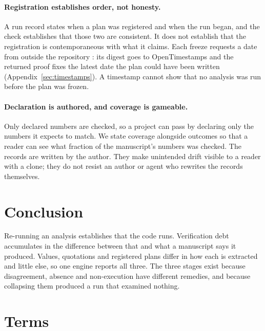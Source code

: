 \documentclass{article}
\begin{document}
\paragraph{Registration establishes order, not honesty.} A run record states when a plan was
registered and when the run began, and the check establishes that those two are consistent. It
does not establish that the registration is contemporaneous with what it claims. Each
freeze requests a date from outside the repository \citep{adams2001rfc3161}: its digest goes to OpenTimestamps
\citep{todd2016opentimestamps} and the returned proof fixes the latest date the plan could have been
written (Appendix~\ref{sec:timestamps}). A timestamp cannot show that no analysis was run before the plan
was frozen.

\paragraph{Declaration is authored, and coverage is gameable.} Only declared numbers are checked,
so a project can pass by declaring only the numbers it expects to match. We state coverage
alongside outcomes so that a reader can see what fraction of the manuscript's numbers was
checked. The records are written by the author. They make unintended drift visible to a reader
with a clone; they do not resist an author or agent who rewrites the records themselves.

\section{Conclusion}

Re-running an analysis establishes that the code runs. Verification debt accumulates in the
difference between that and what a manuscript says it produced. Values, quotations and registered
plans differ in how each is extracted and little else, so one engine reports all three. The three
stages exist because disagreement, absence and non-execution have different remedies, and because
collapsing them produced a run that examined nothing.




\clearpage
\appendix



\section{Terms}
\label{sec:terms}
\end{document}
